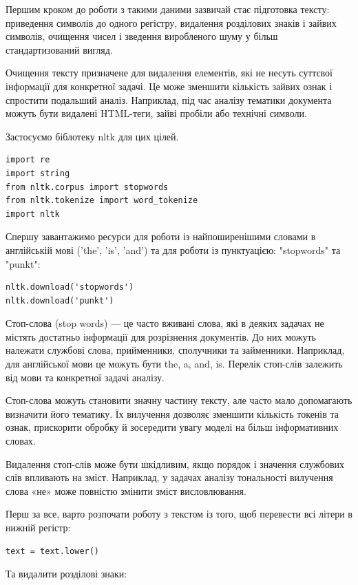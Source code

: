 Першим кроком до роботи з такими даними зазвичай стає підготовка тексту: приведення символів до одного регістру, видалення розділових знаків і зайвих символів, очищення чисел і зведення виробленого шуму у більш стандартизований вигляд.

Очищення тексту призначене для видалення елементів, які не несуть суттєвої інформації для конкретної задачі. Це може зменшити кількість зайвих ознак і спростити подальший аналіз. Наприклад, під час аналізу тематики документа можуть бути видалені HTML-теги, зайві пробіли або технічні символи.

Застосуємо біблотеку nltk для цих цілей. 

\begin{lstlisting}
import re
import string
from nltk.corpus import stopwords
from nltk.tokenize import word_tokenize
import nltk
\end{lstlisting}

Спершу завантажимо ресурси для роботи із найпоширенішими словами в англійській мові ('the', 'is', 'and') та для роботи із пунктуацією: "stopwords" та "punkt":

\begin{lstlisting}
nltk.download('stopwords')
nltk.download('punkt')
\end{lstlisting}

Стоп-слова (stop words) — це часто вживані слова, які в деяких задачах не містять достатньо інформації для розрізнення документів. До них можуть належати службові слова, прийменники, сполучники та займенники. Наприклад, для англійської мови це можуть бути the, a, and, is. Перелік стоп-слів залежить від мови та конкретної задачі аналізу.

Стоп-слова можуть становити значну частину тексту, але часто мало допомагають визначити його тематику. Їх вилучення дозволяє зменшити кількість токенів та ознак, прискорити обробку й зосередити увагу моделі на більш інформативних словах.

Видалення стоп-слів може бути шкідливим, якщо порядок і значення службових слів впливають на зміст. Наприклад, у задачах аналізу тональності вилучення слова «не» може повністю змінити зміст висловлювання.

Перш за все, варто розпочати роботу з текстом із того, щоб перевести всі літери в нижній регістр:

\begin{lstlisting}
text = text.lower()
\end{lstlisting}

Та видалити розділові знаки:

